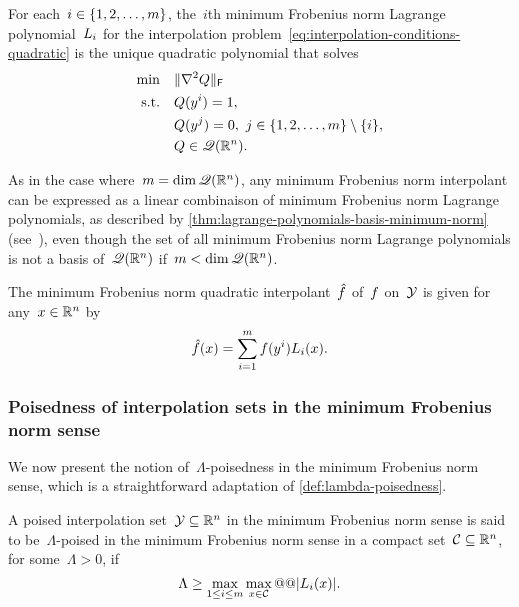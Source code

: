 \begin{definition}
    \label{def:lagrange-polynomials-minimum-norm}
    For each~$i \in \{1, 2, \dots, m\}$, the~$i$th minimum Frobenius norm Lagrange polynomial~$\lagp[i]$ for the interpolation problem~\cref{eq:interpolation-conditions-quadratic} is the unique quadratic polynomial that solves
    \begin{align*}
        \min        & \quad \lVert\nabla^2 Q\rVert_{\mathsf{F}}\\
        \text{s.t.} & \quad Q(y^i) = 1,\\
                    & \quad Q(y^j) = 0, ~ j \in \{1, 2, \dots, m\} \setminus \{i\},\\
                    & \quad Q \in \mathscr{Q}(\mathbb{R}^n).
    \end{align*}
\end{definition}

As in the case where~$m = \dim \mathscr{Q}(\mathbb{R}^n)$, any minimum Frobenius norm interpolant can be expressed as a linear combinaison of minimum Frobenius norm Lagrange polynomials, as described by \cref{thm:lagrange-polynomials-basis-minimum-norm} (see~\cite[\S~3]{Powell_2004b}), even though the set of all minimum Frobenius norm Lagrange polynomials is not a basis of~$\mathscr{Q}(\mathbb{R}^n)$ if~$m < \dim \mathscr{Q}(\mathbb{R}^n)$.

\begin{theorem}
    \label{thm:lagrange-polynomials-basis-minimum-norm}
    The minimum Frobenius norm quadratic interpolant~$\objm$ of~$f$ on~$\xpt$ is given for any~$\iter \in \R^n$ by
    \begin{equation*}
        \objm(\iter) = \sum_{i = 1}^m \obj(y^i) \lagp[i](\iter).
    \end{equation*}
\end{theorem}

\subsubsection{Poisedness of interpolation sets in the minimum Frobenius norm sense}

We now present the notion of~$\Lambda$-poisedness in the minimum Frobenius norm sense, which is a straightforward adaptation of \cref{def:lambda-poisedness}.

\begin{definition}
    \label{def:lambda-poisedness-minimum-norm}
    A poised interpolation set~$\xpt \subseteq \R^n$ in the minimum Frobenius norm sense is said to be~$\Lambda$-poised in the minimum Frobenius norm sense in a compact set~$\mathcal{C} \subseteq \mathbb{R}^n$, for some~$\Lambda > 0$, if
    \begin{equation*}
        \Lambda \ge \max_{1 \le i \le m} \max_{\iter \in \mathcal{C}} @@ \abs{\lagp[i](\iter)}.
    \end{equation*}
\end{definition}

